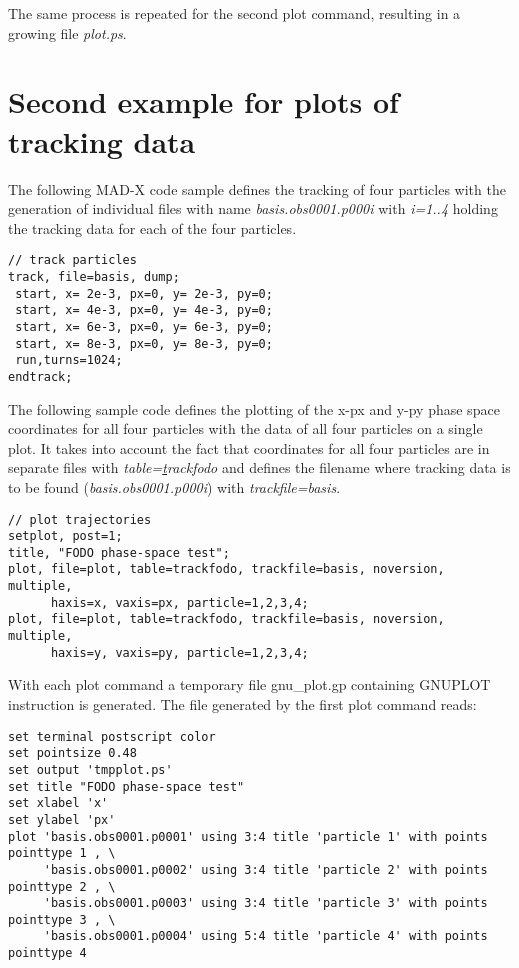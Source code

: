 The same process is repeated for the second plot command, resulting in a
growing file \textit{plot.ps}.


\section{Second example for plots of tracking data}

The following MAD-X code sample defines the tracking of four particles 
with the generation of individual files with name
\textit{basis.obs0001.p000i} with \textit{i=1..4}  
holding the tracking data for each of the four particles.  

\begin{verbatim}
// track particles
track, file=basis, dump;
 start, x= 2e-3, px=0, y= 2e-3, py=0;
 start, x= 4e-3, px=0, y= 4e-3, py=0;
 start, x= 6e-3, px=0, y= 6e-3, py=0;
 start, x= 8e-3, px=0, y= 8e-3, py=0;
 run,turns=1024;
endtrack;
\end{verbatim}

The following sample code defines the plotting of the x-px and y-py
phase space coordinates for all four particles with the data of all four
particles on a single plot.  
It takes into account the fact that coordinates for all four particles
are in separate files with 
\textit{table={\underline track}fodo} and defines the filename where tracking
data is to be found (\textit{basis.obs0001.p000i}) with
\textit{trackfile=basis}.  

\begin{verbatim}
// plot trajectories
setplot, post=1; 
title, "FODO phase-space test";
plot, file=plot, table=trackfodo, trackfile=basis, noversion, multiple, 
      haxis=x, vaxis=px, particle=1,2,3,4; 
plot, file=plot, table=trackfodo, trackfile=basis, noversion, multiple, 
      haxis=y, vaxis=py, particle=1,2,3,4;  
\end{verbatim}

With each plot command a temporary file gnu\_plot.gp containing GNUPLOT instruction is generated. 
The file generated by the first plot command reads: 

{\footnotesize \begin{verbatim}
set terminal postscript color
set pointsize 0.48
set output 'tmpplot.ps'
set title "FODO phase-space test"
set xlabel 'x'
set ylabel 'px'
plot 'basis.obs0001.p0001' using 3:4 title 'particle 1' with points pointtype 1 , \
     'basis.obs0001.p0002' using 3:4 title 'particle 2' with points pointtype 2 , \
     'basis.obs0001.p0003' using 3:4 title 'particle 3' with points pointtype 3 , \
     'basis.obs0001.p0004' using 5:4 title 'particle 4' with points pointtype 4 
\end{verbatim}}

